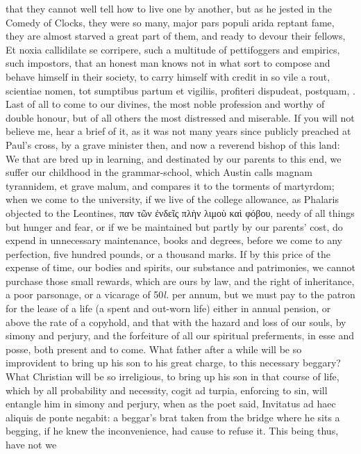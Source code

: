{that they cannot well tell how to live one by another, but as he jested
in the Comedy of Clocks, they were so many, major pars populi
arida reptant fame, they are almost starved a great part of them, and
ready to devour their fellows, Et noxia callidilate se corripere,
such a multitude of pettifoggers and empirics, such impostors, that an
honest man knows not in what sort to compose and behave himself in
their society, to carry himself with credit in so vile a rout,
scientiae nomen, tot sumptibus partum et vigiliis, profiteri dispudeat,
postquam, \etc{}.
Last of all to come to our divines, the most noble profession and
worthy of double honour, but of all others the most distressed and
miserable. If you will not believe me, hear a brief of it, as it was
not many years since publicly preached at Paul's cross, by a
grave minister then, and now a reverend bishop of this land: We that
are bred up in learning, and destinated by our parents to this end, we
suffer our childhood in the grammar-school, which Austin calls magnam
tyrannidem, et grave malum, and compares it to the torments of
martyrdom; when we come to the university, if we live of the college
allowance, as Phalaris objected to the Leontines, \textgreek{παν τῶν ἐνδεῖς πλὴν
λιμοὺ καὶ φόβου}, needy of all things but hunger and fear, or if we be
maintained but partly by our parents' cost, do expend in unnecessary
maintenance, books and degrees, before we come to any perfection, five
hundred pounds, or a thousand marks. If by this price of the expense of
time, our bodies and spirits, our substance and patrimonies, we cannot
purchase those small rewards, which are ours by law, and the right of
inheritance, a poor parsonage, or a vicarage of 50\emph{l.} per annum, but
we must pay to the patron for the lease of a life (a spent and out-worn
life) either in annual pension, or above the rate of a copyhold, and
that with the hazard and loss of our souls, by simony and perjury, and
the forfeiture of all our spiritual preferments, in esse and posse,
both present and to come. What father after a while will be so
improvident to bring up his son to his great charge, to this necessary
beggary? What Christian will be so irreligious, to bring up his son in
that course of life, which by all probability and necessity, cogit ad
turpia, enforcing to sin, will entangle him in simony and perjury, when
as the poet said, Invitatus ad haec aliquis de ponte negabit: a
beggar's brat taken from the bridge where he sits a begging, if he knew
the inconvenience, had cause to refuse it. This being thus, have not we
}
